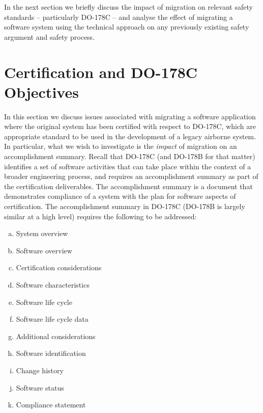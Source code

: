 \documentclass{llncs}
\begin{document}
In the next section we briefly discuss the impact of migration on relevant safety standards -- particularly  DO-178C -- and analyse the effect of migrating
a software system using the technical approach on any previously existing safety argument and safety process.

\section{Certification and DO-178C Objectives}
In this section we discuss issues associated with migrating a software application where the original system has been certified with respect to  DO-178C,
which are appropriate standard to be used in the development of a legacy airborne system. In particular, what we wish to investigate is the \textit{impact}
of migration on an accomplishment summary. Recall that DO-178C (and DO-178B for that matter) identifies a set of software activities that can take place within the context of a broader 
engineering process, and requires an accomplishment summary \cite{DO178C} as part of the certification deliverables. The accomplishment summary is a 
document that demonstrates compliance of a system with the plan for software aspects of certification. The accomplishment summary in
DO-178C (DO-178B is largely similar at a high level) requires the following to be addressed:

\begin{enumerate}[(a)]
\item System overview
\item Software overview
\item Certification considerations
\item Software characteristics
\item Software life cycle 
\item Software life cycle data
\item Additional considerations
\item Software identification
\item Change history
\item Software status
\item Compliance statement
\end{enumerate}
\end{document}
